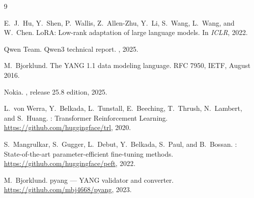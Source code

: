 \documentclass[12pt, a4paper]{article}
\begin{document}

\begin{thebibliography}{9}

E.~J.~Hu, Y.~Shen, P.~Wallis, Z.~Allen-Zhu, Y.~Li, S.~Wang, L.~Wang, and
  W.~Chen.
\newblock Lo{RA}: Low-rank adaptation of large language models.
\newblock In {\em ICLR}, 2022.

Qwen Team.
\newblock Qwen3 technical report.
, 2025.

M.~Bjorklund.
\newblock The {YANG} 1.1 data modeling language.
\newblock RFC 7950, IETF, August 2016.

Nokia.
, release
  25.8 edition, 2025.

L.~von Werra, Y.~Belkada, L.~Tunstall, E.~Beeching, T.~Thrush, N.~Lambert,
  and S.~Huang.
: Transformer Reinforcement Learning.
\newblock \url{https://github.com/huggingface/trl}, 2020.

S.~Mangrulkar, S.~Gugger, L.~Debut, Y.~Belkada, S.~Paul, and B.~Bossan.
: State-of-the-art parameter-efficient fine-tuning methods.
\newblock \url{https://github.com/huggingface/peft}, 2022.

M.~Bjorklund.
\newblock pyang --- {YANG} validator and converter.
\newblock \url{https://github.com/mbj4668/pyang}, 2023.

\end{thebibliography}
\end{document}
